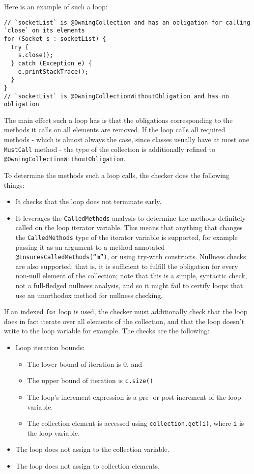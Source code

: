 Here is an example of such a loop:

\begin{verbatim}
// `socketList` is @OwningCollection and has an obligation for calling `close` on its elements
for (Socket s : socketList) {
  try {
    s.close();
  } catch (Exception e) {
    e.printStackTrace();
  }
}
// `socketList` is @OwningCollectionWithoutObligation and has no obligation
\end{verbatim}

The main effect such a loop has is that the obligations corresponding to the methods it calls on all elements are removed. If the loop calls all required methods - which is almost always the case, since classes usually have at most one \texttt{MustCall} method - the type of the collection is additionally refined to \texttt{@OwningCollectionWithoutObligation}.

To determine the methods such a loop calls, the checker does the following things:

\begin{itemize}
  \item It checks that the loop does not terminate early.
  \item It leverages the \texttt{CalledMethods} analysis to determine the methods definitely called on the loop iterator variable. This means that anything that changes the \texttt{CalledMethods} type of the iterator variable is supported, for example passing it as an argument to a method annotated \texttt{@EnsuresCalledMethods(``m'')}, or using try-with constructs. Nullness checks are also supported: that is, it is sufficient to fulfill the obligation for every non-null element of the collection; note that this is a simple, syntactic check, not a full-fledged nullness analysis, and so it might fail to certify loops that use an unorthodox method for nullness checking.
\end{itemize}

If an indexed \texttt{for} loop is used, the checker must additionally check that the loop does in fact iterate over all elements of the collection, and that the loop doesn't write to the loop variable for example. The checks are the following:

\begin{itemize}
  \item Loop iteration bounds:
    \begin{itemize}
      \item The lower bound of iteration is 0, and
      \item The upper bound of iteration is \texttt{c.size()}
      \item The loop's increment expression is a pre- or post-increment of the loop variable.
      \item The collection element is accessed using \texttt{collection.get(i)}, where \texttt{i} is the loop variable.
    \end{itemize}
  \item The loop does not assign to the collection variable.
  \item The loop does not assign to collection elements.
\end{itemize}

